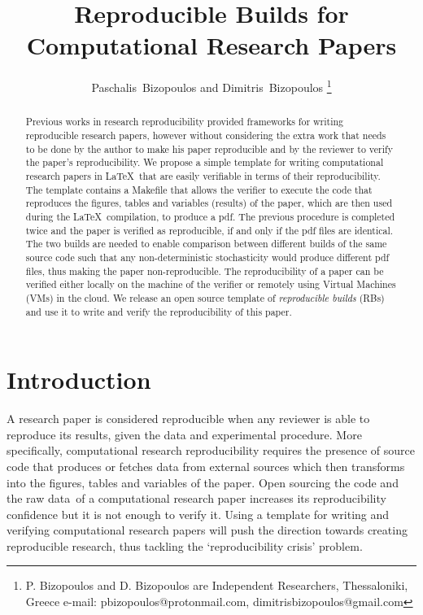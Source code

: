 \documentclass[journal]{IEEEtran}
\begin{document}

\title{Reproducible Builds for\\ Computational Research Papers}

\author{Paschalis~Bizopoulos and Dimitris~Bizopoulos
\thanks{P. Bizopoulos and D. Bizopoulos are Independent Researchers, Thessaloniki, Greece e-mail: pbizopoulos@protonmail.com, dimitrisbizopoulos@gmail.com}}

\maketitle

\begin{abstract}
	Previous works in research reproducibility provided frameworks for writing reproducible research papers, however without considering the extra work that needs to be done by the author to make his paper reproducible and by the reviewer to verify the paper's reproducibility.
	We propose a simple template for writing computational research papers in \LaTeX\ that are easily verifiable in terms of their reproducibility.
	The template contains a Makefile that allows the verifier to execute the code that reproduces the figures, tables and variables (results) of the paper, which are then used during the \LaTeX\ compilation, to produce a pdf.
	The previous procedure is completed twice and the paper is verified as reproducible, if and only if the pdf files are identical.
	The two builds are needed to enable comparison between different builds of the same source code such that any non-deterministic stochasticity would produce different pdf files, thus making the paper non-reproducible.
	The reproducibility of a paper can be verified either locally on the machine of the verifier or remotely using Virtual Machines (VMs) in the cloud.
	We release an open source template of \textit{reproducible builds} (RBs) and use it to write and verify the reproducibility of this paper.
\end{abstract}

\section{Introduction}
A research paper is considered reproducible when any reviewer is able to reproduce its results, given the data and experimental procedure.
More specifically, computational research reproducibility requires the presence of source code that produces or fetches data from external sources which then transforms into the figures, tables and variables of the paper.
Open sourcing the code and the raw data of a computational research paper increases its reproducibility confidence but it is not enough to verify it.
Using a template for writing and verifying computational research papers will push the direction towards creating reproducible research, thus tackling the `reproducibility crisis' problem.
\end{document}
